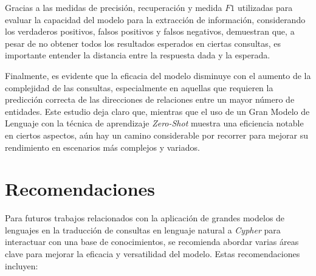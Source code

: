 Gracias a las medidas de precisión, recuperación y medida $F1$ utilizadas para evaluar la capacidad del modelo para la extracción de información, considerando los verdaderos positivos, falsos positivos y falsos negativos, demuestran que, a pesar de no obtener todos los resultados esperados en ciertas consultas, es importante entender la distancia entre la respuesta dada y la esperada.

Finalmente, es evidente que la eficacia del modelo disminuye con el aumento de la complejidad de las consultas, especialmente en aquellas que requieren la predicción correcta de las direcciones de relaciones entre un mayor número de entidades. Este estudio deja claro que, mientras que el uso de un Gran Modelo de Lenguaje con la técnica de aprendizaje \textit{Zero-Shot} muestra una eficiencia notable en ciertos aspectos, aún hay un camino considerable por recorrer para mejorar su rendimiento en escenarios más complejos y variados.

\chapter*{Recomendaciones}\label{chapter:conclusions}
Para futuros trabajos relacionados con la aplicación de grandes modelos de lenguajes en la traducción de consultas en lenguaje natural a \textit{Cypher} para interactuar con una base de conocimientos, se recomienda abordar varias áreas clave para mejorar la eficacia y versatilidad del modelo. Estas recomendaciones incluyen:

